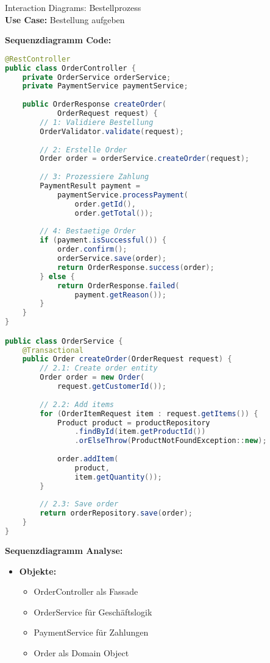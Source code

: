 \begin{example2}[breakable]{Interaction Diagrams: Bestellprozess}\\
\textbf{Use Case:} Bestellung aufgeben

\textbf{Sequenzdiagramm Code:}
\begin{lstlisting}[language=Java, style=basesmol]
@RestController
public class OrderController {
    private OrderService orderService;
    private PaymentService paymentService;
    
    public OrderResponse createOrder(
            OrderRequest request) {
        // 1: Validiere Bestellung
        OrderValidator.validate(request);
        
        // 2: Erstelle Order
        Order order = orderService.createOrder(request);
        
        // 3: Prozessiere Zahlung
        PaymentResult payment = 
            paymentService.processPayment(
                order.getId(), 
                order.getTotal());
        
        // 4: Bestaetige Order
        if (payment.isSuccessful()) {
            order.confirm();
            orderService.save(order);
            return OrderResponse.success(order);
        } else {
            return OrderResponse.failed(
                payment.getReason());
        }
    }
}

public class OrderService {
    @Transactional
    public Order createOrder(OrderRequest request) {
        // 2.1: Create order entity
        Order order = new Order(
            request.getCustomerId());
            
        // 2.2: Add items
        for (OrderItemRequest item : request.getItems()) {
            Product product = productRepository
                .findById(item.getProductId())
                .orElseThrow(ProductNotFoundException::new);
                
            order.addItem(
                product, 
                item.getQuantity());
        }
        
        // 2.3: Save order
        return orderRepository.save(order);
    }
}
\end{lstlisting}

\textbf{Sequenzdiagramm Analyse:}
\begin{itemize}
    \item \textbf{Objekte:}
    \begin{itemize}
        \item OrderController als Fassade
        \item OrderService für Geschäftslogik
        \item PaymentService für Zahlungen
        \item Order als Domain Object
    \end{itemize}
    

\end{itemize}
\end{example2}
